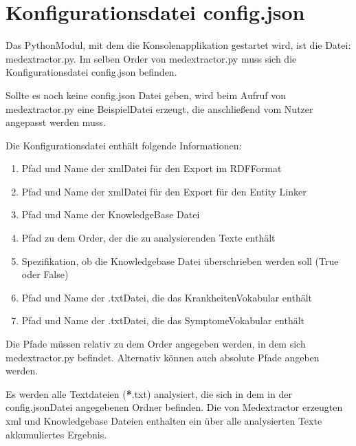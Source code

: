 \documentclass[letterpaper,10pt,english]{sphinxmanual}
\begin{document}
\chapter{Konfigurationsdatei config.json}
\label{\detokenize{readme:konfigurationsdatei-config-json}}
\sphinxAtStartPar
Das Python\sphinxhyphen{}Modul, mit dem die Konsolenapplikation gestartet wird, ist
die Datei: medextractor.py. Im selben Order von medextractor.py muss
sich die Konfigurationsdatei config.json befinden.

\sphinxAtStartPar
Sollte es noch keine config.json Datei geben, wird beim Aufruf von
medextractor.py eine Beispiel\sphinxhyphen{}Datei erzeugt, die anschließend vom Nutzer
angepasst werden muss.

\sphinxAtStartPar
Die Konfigurationsdatei enthält folgende Informationen:
\begin{enumerate}
%
\item {} 
\sphinxAtStartPar
Pfad und Name der xml\sphinxhyphen{}Datei für den Export im RDF\sphinxhyphen{}Format

\item {} 
\sphinxAtStartPar
Pfad und Name der xml\sphinxhyphen{}Datei für den Export für den Entity Linker

\item {} 
\sphinxAtStartPar
Pfad und Name der KnowledgeBase Datei

\item {} 
\sphinxAtStartPar
Pfad zu dem Order, der die zu analysierenden Texte enthält

\item {} 
\sphinxAtStartPar
Spezifikation, ob die Knowledgebase Datei überschrieben werden soll
(True oder False)

\item {} 
\sphinxAtStartPar
Pfad und Name der .txt\sphinxhyphen{}Datei, die das Krankheiten\sphinxhyphen{}Vokabular enthält

\item {} 
\sphinxAtStartPar
Pfad und Name der .txt\sphinxhyphen{}Datei, die das Symptome\sphinxhyphen{}Vokabular enthält

\end{enumerate}

\sphinxAtStartPar
Die Pfade müssen relativ zu dem Order angegeben werden, in dem sich
medextractor.py befindet. Alternativ können auch absolute Pfade angeben
werden.

\sphinxAtStartPar
Es werden alle Textdateien ({\color{red}\bfseries{}*}.txt) analysiert, die sich in dem in der
config.json\sphinxhyphen{}Datei angegebenen Ordner befinden. Die von Medextractor
erzeugten xml\sphinxhyphen{} und Knowledgebase\sphinxhyphen{} Dateien enthalten ein über alle
analysierten Texte akkumuliertes Ergebnis.
\end{document}
